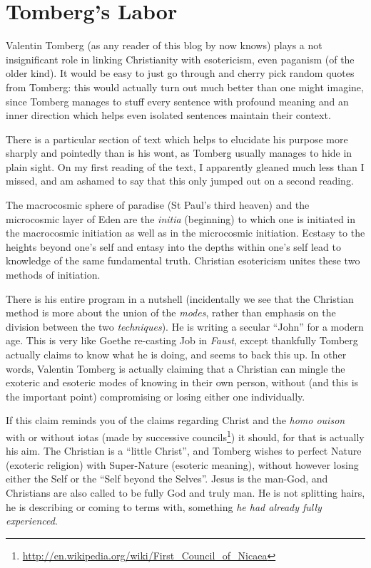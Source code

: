 \section{Tomberg’s Labor}

Valentin Tomberg (as any reader of this blog by now knows) plays a not insignificant role in linking Christianity with esotericism, even paganism (of the older kind). It would be easy to just go through and cherry pick random quotes from Tomberg: this would actually turn out much better than one might imagine, since Tomberg manages to stuff every sentence with profound meaning and an inner direction which helps even isolated sentences maintain their context.

There is a particular section of text which helps to elucidate his purpose more sharply and pointedly than is his wont, as Tomberg usually manages to hide in plain sight. On my first reading of the text, I apparently gleaned much less than I missed, and am ashamed to say that this only jumped out on a second reading.

\begin{quotex}
The macrocosmic sphere of paradise (St Paul's third heaven) and the microcosmic layer of Eden are the \emph{initia} (beginning) to which one is initiated in the macrocosmic initiation as well as in the microcosmic initiation. Ecstasy to the heights beyond one's self and entasy into the depths within one's self lead to knowledge of the same fundamental truth. Christian esotericism unites these two methods of initiation.
\end{quotex}


There is his entire program in a nutshell (incidentally we see that the Christian method is more about the union of the \emph{modes}, rather than emphasis on the division between the two \emph{techniques}). He is writing a secular ``John'' for a modern age. This is very like Goethe re-casting Job in \emph{Faust}, except thankfully Tomberg actually claims to know what he is doing, and seems to back this up. In other words, Valentin Tomberg is actually claiming that a Christian can mingle the exoteric and esoteric modes of knowing in their own person, without (and this is the important point) compromising or losing either one individually.

If this claim reminds you of the claims regarding Christ and the \emph{homo ouison} with or without iotas (made by successive councils\footnote{\url{http://en.wikipedia.org/wiki/First_Council_of_Nicaea}}) it should, for that is actually his aim. The Christian is a ``little Christ'', and Tomberg wishes to perfect Nature (exoteric religion) with Super-Nature (esoteric meaning), without however losing either the Self or the ``Self beyond the Selves''. Jesus is the man-God, and Christians are also called to be fully God and truly man. He is not splitting hairs, he is describing or coming to terms with, something \emph{he had already fully experienced}.


